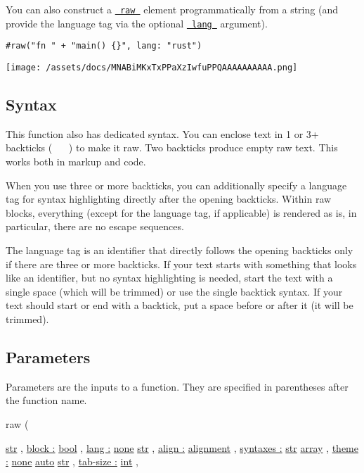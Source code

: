 You can also construct a
\href{/docs/reference/text/raw/}{\texttt{\ raw\ }} element
programmatically from a string (and provide the language tag via the
optional
\href{/docs/reference/text/raw/\#parameters-lang}{\texttt{\ lang\ }}
argument).

\begin{verbatim}
#raw("fn " + "main() {}", lang: "rust")
\end{verbatim}

\texttt{[image: /assets/docs/MNABiMKxTxPPaXzIwfuPPQAAAAAAAAAA.png]}

\subsection{Syntax}\label{syntax}

This function also has dedicated syntax. You can enclose text in 1 or 3+
backticks ( \texttt{\ \textasciigrave{}\ } ) to make it raw. Two
backticks produce empty raw text. This works both in markup and code.

When you use three or more backticks, you can additionally specify a
language tag for syntax highlighting directly after the opening
backticks. Within raw blocks, everything (except for the language tag,
if applicable) is rendered as is, in particular, there are no escape
sequences.

The language tag is an identifier that directly follows the opening
backticks only if there are three or more backticks. If your text starts
with something that looks like an identifier, but no syntax highlighting
is needed, start the text with a single space (which will be trimmed) or
use the single backtick syntax. If your text should start or end with a
backtick, put a space before or after it (it will be trimmed).

\subsection{\texorpdfstring{{ Parameters
}}{ Parameters }}\label{parameters}

\label{parameters-tooltip}
Parameters are the inputs to a function. They are specified in
parentheses after the function name.

{ raw } (

{ \href{/docs/reference/foundations/str/}{str} , } {
\hyperref[parameters-block]{block :}
\href{/docs/reference/foundations/bool/}{bool} , } {
\hyperref[parameters-lang]{lang :}
\href{/docs/reference/foundations/none/}{none}
\href{/docs/reference/foundations/str/}{str} , } {
\hyperref[parameters-align]{align :}
\href{/docs/reference/layout/alignment/}{alignment} , } {
\hyperref[parameters-syntaxes]{syntaxes :}
\href{/docs/reference/foundations/str/}{str}
\href{/docs/reference/foundations/array/}{array} , } {
\hyperref[parameters-theme]{theme :}
\href{/docs/reference/foundations/none/}{none}
\href{/docs/reference/foundations/auto/}{auto}
\href{/docs/reference/foundations/str/}{str} , } {
\hyperref[parameters-tab-size]{tab-size :}
\href{/docs/reference/foundations/int/}{int} , }

